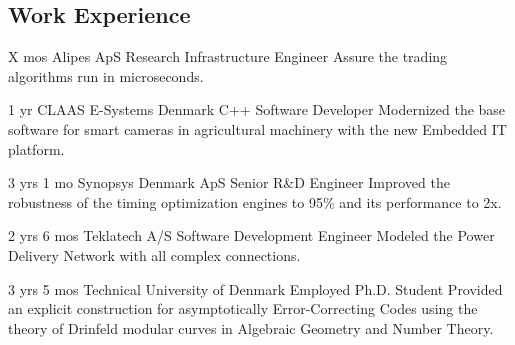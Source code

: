 \documentclass[11pt]{article} %
\begin{document}
\begin{paracol}{2}
\switchcolumn

\section{Work Experience}




{X mos} %
{Alipes ApS} %
{Research Infrastructure Engineer} %
{Assure the trading algorithms run in microseconds.
} %

{1 yr} %
{CLAAS E-Systems Denmark} %
{C++ Software Developer} %
{Modernized the base software for smart cameras in agricultural machinery with the new Embedded IT platform.
} %


{3 yrs 1 mo} %
{Synopsys Denmark ApS} %
{Senior R\&D Engineer} %
{Improved the robustness of the timing optimization engines to 95\% and its performance to 2x.
} %


{2 yrs 6 mos} %
{Teklatech A/S} %
{Software Development Engineer} %
{Modeled the Power Delivery Network with all complex connections.}  %


{3 yrs 5 mos} %
{Technical University of Denmark} %
{Employed Ph.D. Student} %
{Provided an explicit construction for asymptotically Error-Correcting Codes using the theory of Drinfeld modular curves in Algebraic Geometry and Number Theory.} %


\end{paracol}
\end{document}

